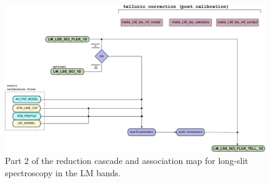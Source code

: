 \begin{landscape}
\begin{figure}[ht]
  \centering
  \includegraphics{figures/LM_LSS_pipeline_wf_draft_latest_part_2_v0.82.pdf}
  \caption[Reduction cascade and association map for LM long-slit
  spectroscopy]{Part 2 of the reduction cascade and association map for long-slit
    spectroscopy in the LM bands.}
  \label{Fig:LMLssAssomap2}
\end{figure}
\end{landscape}




